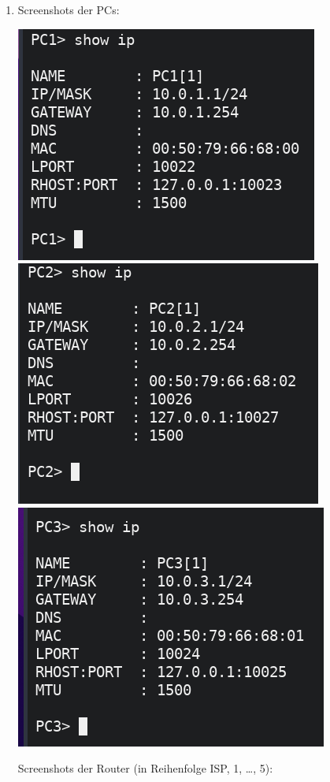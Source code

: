 \documentclass{article}
\begin{document}
\begin{enumerate}
    \item Screenshots der PCs:

    \begin{center}
        \includegraphics[width=.3\textwidth]{img/pc1.png}
        \includegraphics[width=.3\textwidth]{img/pc2.png}
        \includegraphics[width=.3\textwidth]{img/pc3.png}
    \end{center}

    Screenshots der Router (in Reihenfolge ISP, 1, \ldots, 5):


\end{enumerate}
\end{document}
